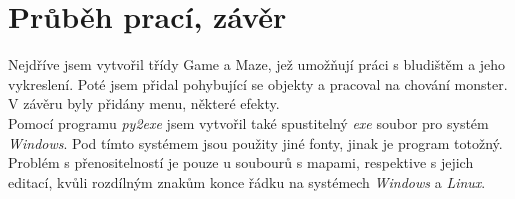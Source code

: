 \documentclass[10pt,a4paper]{article}
\begin{document}
\section{Průběh prací, závěr}
Nejdříve jsem vytvořil třídy Game a Maze, jež umožňují práci s bludištěm a jeho vykreslení. Poté jsem přidal pohybující se objekty a pracoval na chování monster. V závěru byly přidány menu, některé efekty.\\
Pomocí programu \textit{py2exe} jsem vytvořil také spustitelný \textit{exe} soubor pro systém \textit{Windows}. Pod tímto systémem jsou použity jiné fonty, jinak je program totožný. Problém s přenositelností je pouze u soubourů s mapami, respektive s jejich editací, kvůli rozdílným znakům konce řádku na systémech \textit{Windows} a \textit{Linux}.
\end{document}

